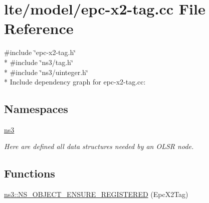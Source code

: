 \hypertarget{epc-x2-tag_8cc}{}\section{lte/model/epc-\/x2-\/tag.cc File Reference}
\label{epc-x2-tag_8cc}
{\ttfamily \#include \char`\"{}epc-\/x2-\/tag.\+h\char`\"{}}\\*
{\ttfamily \#include \char`\"{}ns3/tag.\+h\char`\"{}}\\*
{\ttfamily \#include \char`\"{}ns3/uinteger.\+h\char`\"{}}\\*
Include dependency graph for epc-\/x2-\/tag.cc\+:
\subsection*{Namespaces}
\begin{DoxyCompactItemize}
\item 
 \hyperlink{namespacens3}{ns3}
\begin{DoxyCompactList}\small\item\em Here are defined all data structures needed by an O\+L\+SR node. \end{DoxyCompactList}\end{DoxyCompactItemize}
\subsection*{Functions}
\begin{DoxyCompactItemize}
\item 
\hyperlink{namespacens3_ad46bcd37ce89adc9aa7f028c96447842}{ns3\+::\+N\+S\+\_\+\+O\+B\+J\+E\+C\+T\+\_\+\+E\+N\+S\+U\+R\+E\+\_\+\+R\+E\+G\+I\+S\+T\+E\+R\+ED} (Epc\+X2\+Tag)
\end{DoxyCompactItemize}
